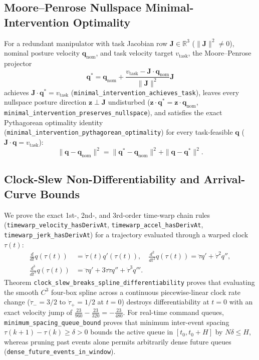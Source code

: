 \documentclass[10pt,twocolumn]{article}
\theoremstyle{definition}
\begin{document}
\subsection{Moore--Penrose Nullspace Minimal-Intervention Optimality}
For a redundant manipulator with task Jacobian row $\mathbf{J} \in \mathbb{R}^3$ ($\|\mathbf{J}\|^2 \neq 0$), nominal posture velocity $\mathbf{q}_{\text{nom}}$, and task velocity target $v_{\text{task}}$, the Moore--Penrose projector
\begin{equation}
  \mathbf{q}^* = \mathbf{q}_{\text{nom}} + \frac{v_{\text{task}} - \mathbf{J}\cdot\mathbf{q}_{\text{nom}}}{\|\mathbf{J}\|^2}\mathbf{J}
\end{equation}
achieves $\mathbf{J}\cdot\mathbf{q}^* = v_{\text{task}}$ (\texttt{minimal\_intervention\_achieves\_task}), leaves every nullspace posture direction $\mathbf{z} \perp \mathbf{J}$ undisturbed ($\mathbf{z}\cdot\mathbf{q}^* = \mathbf{z}\cdot\mathbf{q}_{\text{nom}}$, \texttt{minimal\_intervention\_preserves\_nullspace}), and satisfies the exact Pythagorean optimality identity (\texttt{minimal\_intervention\_pythagorean\_optimality}) for every task-feasible $\mathbf{q}$ ($\mathbf{J}\cdot\mathbf{q} = v_{\text{task}}$):
\begin{equation}
  \|\mathbf{q} - \mathbf{q}_{\text{nom}}\|^2 = \|\mathbf{q}^* - \mathbf{q}_{\text{nom}}\|^2 + \|\mathbf{q} - \mathbf{q}^*\|^2.
\end{equation}

\subsection{Clock-Slew Non-Differentiability and Arrival-Curve Bounds}
We prove the exact 1st-, 2nd-, and 3rd-order time-warp chain rules (\texttt{timewarp\_velocity\_hasDerivAt}, \texttt{timewarp\_accel\_hasDerivAt}, \texttt{timewarp\_jerk\_hasDerivAt}) for a trajectory evaluated through a warped clock $\tau(t)$:
\begin{align}
  \frac{d}{dt}q(\tau(t)) &= \dot{\tau}(t)q'(\tau(t)), \quad
  \frac{d^2}{dt^2}q(\tau(t)) = \ddot{\tau}q' + \dot{\tau}^2 q'', \\
  \frac{d^3}{dt^3}q(\tau(t)) &= \dddot{\tau}q' + 3\dot{\tau}\ddot{\tau}q'' + \dot{\tau}^3 q'''.
\end{align}
Theorem \texttt{clock\_slew\_breaks\_spline\_differentiability} proves that evaluating the smooth $C^3$ four-box spline across a continuous piecewise-linear clock rate change ($\dot{\tau}_- = 3/2$ to $\dot{\tau}_+ = 1/2$ at $t=0$) destroys differentiability at $t=0$ with an exact velocity jump of $\frac{23}{960} - \frac{23}{320} = -\frac{23}{480}$. For real-time command queues, \texttt{minimum\_spacing\_queue\_bound} proves that minimum inter-event spacing $\tau(k+1) - \tau(k) \ge \delta > 0$ bounds the active queue in $[t_0, t_0 + H]$ by $N\delta \le H$, whereas pruning past events alone permits arbitrarily dense future queues (\texttt{dense\_future\_events\_in\_window}).
\end{document}
